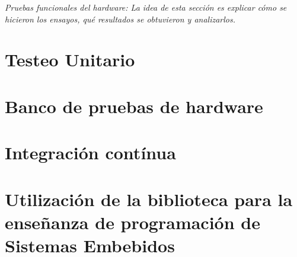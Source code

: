 \emph{Pruebas funcionales del hardware: La idea de esta sección es explicar cómo se hicieron los ensayos, qué resultados se obtuvieron y analizarlos.}

\section{Testeo Unitario}
\label{sec:unitTest}


\section{Banco de pruebas de hardware}
\label{sec:testBench}


\section{Integración contínua}
\label{sec:ci}


\section{Utilización de la biblioteca para la enseñanza de programación de Sistemas Embebidos}
\label{sec:teach}

